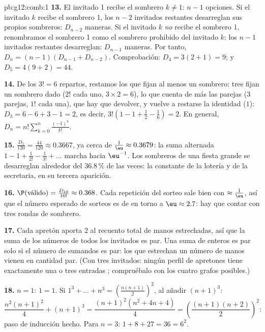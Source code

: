 \begin{solution}{pb:g12:comb:1}
\textbf{13.} El invitado 1 recibe el sombrero $k \neq 1$: $n - 1$ opciones.
Si el invitado $k$ recibe el sombrero 1, los $n - 2$ invitados restantes
desarreglan sus propios sombreros: $D_{n-2}$ maneras. Si el invitado $k$
\emph{no} recibe el sombrero 1, renombramos el sombrero 1 como el sombrero
prohibido del invitado $k$: los $n - 1$ invitados restantes desarreglan:
$D_{n-1}$ maneras. Por tanto,
$D_n = (n-1)(D_{n-1} + D_{n-2})$. Comprobación:
$D_4 = 3(2 + 1) = 9$; y $D_5 = 4(9 + 2) = 44$.

\textbf{14.} De los $3! = 6$ repartos, restamos los que fijan al menos un
sombrero: tres fijan un sombrero dado ($2!$ cada uno,
$3 \times 2 = 6$), lo que cuenta de más las parejas ($3$ parejas, $1!$ cada
una), que hay que devolver, y vuelve a restarse la identidad ($1$):
$D_3 = 6 - 6 + 3 - 1 = 2$, es decir,
$3!\left(1 - 1 + \frac12 - \frac16\right) = 2$. En general,
$D_n = n!\sum_{k=0}^{n} \frac{(-1)^k}{k!}$.

\textbf{15.} $\frac{D_5}{120} = \frac{44}{120} \approx 0.3667$, ya cerca de
$\frac1\eu \approx 0.3679$: la suma alternada
$1 - 1 + \frac{1}{2!} - \frac{1}{3!} + \dots$ marcha hacia $\eu^{-1}$. Los
sombreros de una fiesta grande se desarreglan alrededor del $36.8\,\%$ de
las veces: la constante de la lotería y de la secretaria, en su tercera
aparición.

\textbf{16.} $\P(\text{válido}) = \frac{D_{10}}{10!} \approx 0.368$. Cada
repetición del sorteo sale bien con  $\approx \frac1\eu$, así
que el número esperado de sorteos es de en torno a $\eu \approx 2.7$: hay
que contar con tres rondas de sombrero.

\textbf{17.} Cada apretón aporta $2$ al recuento total de manos
estrechadas, así que la suma de los números de todos los invitados es par.
Una suma de enteros es par solo si el número de sumandos  es par:
los que estrechan un número  de manos vienen en cantidad par. (Con
tres invitados: ningún perfil de apretones tiene exactamente una o tres
entradas ; compruébalo con los cuatro grafos posibles.)

\textbf{18.} $n = 1$: $1 = 1$. Si
$1^3 + \dots + n^3 = \left(\frac{n(n+1)}{2}\right)^2$, al añadir
$(n+1)^3$:
\[
\frac{n^2(n+1)^2}{4} + (n+1)^3
= \frac{(n+1)^2\left(n^2 + 4n + 4\right)}{4}
= \left(\frac{(n+1)(n+2)}{2}\right)^{\!2} :
\]
paso de inducción hecho. Para $n = 3$: $1 + 8 + 27 = 36 = 6^2$.


\end{solution}
